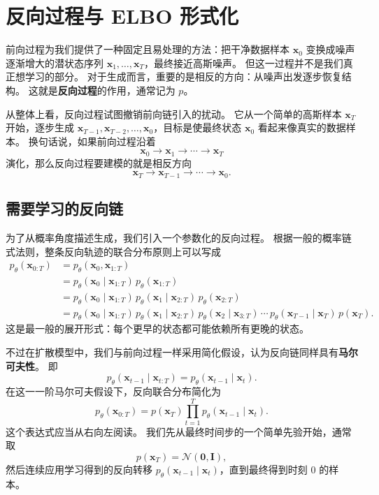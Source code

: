 \section{反向过程与 ELBO 形式化}

前向过程为我们提供了一种固定且易处理的方法：把干净数据样本 $\mathbf{x}_0$ 变换成噪声逐渐增大的潜状态序列
$\mathbf{x}_1,\dots,\mathbf{x}_T$，最终接近高斯噪声。
但这一过程并不是我们真正想学习的部分。
对于生成而言，重要的是相反的方向：从噪声出发逐步恢复结构。
这就是\textbf{反向过程}的作用，通常记为 $p$。

从整体上看，反向过程试图撤销前向链引入的扰动。
它从一个简单的高斯样本 $\mathbf{x}_T$ 开始，逐步生成
$\mathbf{x}_{T-1},\mathbf{x}_{T-2},\dots,\mathbf{x}_0$，目标是使最终状态 $\mathbf{x}_0$ 看起来像真实的数据样本。
换句话说，如果前向过程沿着
\[
\mathbf{x}_0 \longrightarrow \mathbf{x}_1 \longrightarrow \cdots \longrightarrow \mathbf{x}_T
\]
演化，那么反向过程要建模的就是相反方向
\[
\mathbf{x}_T \longrightarrow \mathbf{x}_{T-1} \longrightarrow \cdots \longrightarrow \mathbf{x}_0.
\]

\subsection{需要学习的反向链}

为了从概率角度描述生成，我们引入一个参数化的反向过程。
根据一般的概率链式法则，整条反向轨迹的联合分布原则上可以写成
\[
\begin{aligned}
p_\theta(\mathbf{x}_{0:T})
&= p_\theta(\mathbf{x}_0,\mathbf{x}_{1:T}) \\[4pt]
&= p_\theta(\mathbf{x}_0\mid \mathbf{x}_{1:T})\,p_\theta(\mathbf{x}_{1:T}) \\[4pt]
&= p_\theta(\mathbf{x}_0\mid \mathbf{x}_{1:T})\,
   p_\theta(\mathbf{x}_1\mid \mathbf{x}_{2:T})\,
   p_\theta(\mathbf{x}_{2:T}) \\[4pt]
&= p_\theta(\mathbf{x}_0\mid \mathbf{x}_{1:T})\,
   p_\theta(\mathbf{x}_1\mid \mathbf{x}_{2:T})\,
   p_\theta(\mathbf{x}_2\mid \mathbf{x}_{3:T})\,
   \cdots\,
   p_\theta(\mathbf{x}_{T-1}\mid \mathbf{x}_T)\,
   p(\mathbf{x}_T).
\end{aligned}
\]
这是最一般的展开形式：每个更早的状态都可能依赖所有更晚的状态。

不过在扩散模型中，我们与前向过程一样采用简化假设，认为反向链同样具有\textbf{马尔可夫性}。
即
\[
p_\theta(\mathbf{x}_{t-1}\mid \mathbf{x}_{t:T})
=
p_\theta(\mathbf{x}_{t-1}\mid \mathbf{x}_t).
\]
在这一一阶马尔可夫假设下，反向联合分布简化为
\[
p_\theta(\mathbf{x}_{0:T})
=
p(\mathbf{x}_T)\prod_{t=1}^{T} p_\theta(\mathbf{x}_{t-1}\mid \mathbf{x}_t).
\]
这个表达式应当从右向左阅读。
我们先从最终时间步的一个简单先验开始，通常取
\[
p(\mathbf{x}_T)=\mathcal{N}(\mathbf{0},\mathbf{I}),
\]
然后连续应用学习得到的反向转移
$p_\theta(\mathbf{x}_{t-1}\mid \mathbf{x}_t)$，直到最终得到时刻 $0$ 的样本。

